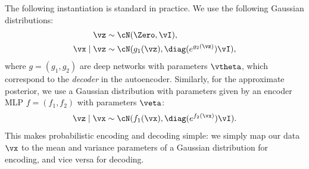 \documentclass[../../book-main.tex]{subfiles}
\begin{document}
The following instantiation is standard in practice. We use the following
Gaussian distributions:
\begin{align*}
\vz &\sim \cN(\Zero, \vI), \\
\vx \mid \vz &\sim \cN(g_1(\vz), \diag(e^{g_2(\vz)}) \vI),
\end{align*}
where $g = (g_1, g_2)$ are deep networks with parameters $\vtheta$, which
correspond to the \textit{decoder} in the autoencoder.
Similarly, for the approximate posterior, we use
a Gaussian distribution with parameters given by an encoder
MLP $f = (f_1, f_2)$ with parameters $\veta$:
\begin{equation*}
\vz \mid \vx \sim \cN(f_1(\vx), \diag(e^{f_2(\vx)}) \vI).
\end{equation*}
This makes probabilistic encoding and decoding simple: we simply map our data
$\vx$ to the mean and variance parameters of a Gaussian distribution for
encoding, and vice versa for decoding.
\end{document}
